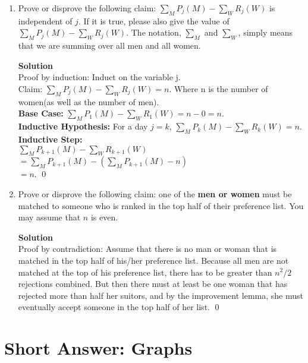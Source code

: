 \documentclass[11pt]{article}
\newcommand*{\Question}[1]{\section{#1}}
\newenvironment{Parts}{\begin{enumerate}[label=(\alph*)]}{\end{enumerate}}
\newcommand*{\Part}{\item}
\begin{document}
\begin{Parts}
\Part  Prove or disprove the following claim: $\sum_M P_j(M) - \sum_W R_j(W)$ is independent of $j$. If it is true, please also give the value of $\sum_M P_j(M) - \sum_W R_j(W)$. The notation, $\sum_M$ and $\sum_W$, simply means that we are summing over all men and all women.

\begin{mdframed} \textbf{Solution} \\
Proof by induction: Induct on the variable j. \\
Claim: $\sum_M P_j(M) - \sum_W R_j(W) = n$. Where n is the number of women(as well as the number of men). \\
\textbf{Base Case: }$\sum_M P_1(M) - \sum_W R_1(W) = n - 0 = n$. \\
\textbf{Inductive Hypothesis: }For a day $j=k$, $\sum_M P_k(M) - \sum_W R_k(W) = n$. \\
\textbf{Inductive Step: }\\
$\sum_M P_{k+1}(M) - \sum_W R_{k+1}(W)$ \\
$= \sum_M P_{k+1}(M) - (\sum_M P_{k+1}(M) - n)$ \\
$= n$. \qed
\end{mdframed}

\Part  Prove or disprove the following claim: one of the \textbf{men or women} must be matched to someone who is ranked in the top half of their preference list. You may assume that $n$ is even. 

\begin{mdframed} \textbf{Solution} \\
Proof by contradiction: Assume that there is no man or woman that is matched in the top half of his/her preference list. Because all men are not matched at the top of his preference list, there has to be greater than $n^2/2$ rejections combined. But then there must at least be one woman that has rejected more than half her suitors, and by the improvement lemma, she must eventually accept someone in the top half of her list. \qed
\end{mdframed}

\end{Parts}




\Question{Short Answer: Graphs}
\end{document}
